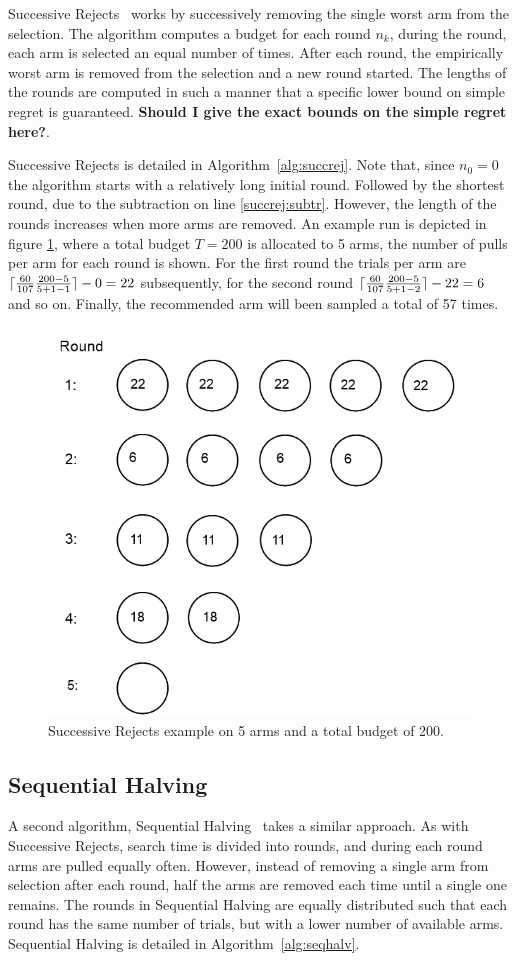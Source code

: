 \documentclass{kecsmstr}
\DeclarePairedDelimiter{\ceil}{\lceil}{\rceil}
\newcommand{\TODO}[1]{\textbf{\color{red}#1}}
\begin{document}
Successive Rejects~ works by successively removing the single worst arm from the selection. The algorithm computes a budget for each round $n_k$, during the round, each arm is selected an equal number of times. After each round, the empirically worst arm is removed from the selection and a new round started. The lengths of the rounds are computed in such a manner that a specific lower bound on simple regret is guaranteed. \TODO{Should I give the exact bounds on the simple regret here?}. 

Successive Rejects is detailed in Algorithm~\ref{alg:succrej}. Note that, since $n_0 = 0$ the algorithm starts with a relatively long initial round. Followed by the shortest round, due to the subtraction on line \ref{succrej:subtr}. However, the length of the rounds increases when more arms are removed. An example run is depicted in figure \ref{fig:succ-rej}, where a total budget $T = 200$ is allocated to 5 arms, the number of pulls per arm for each round is shown. For the first round the trials per arm are $\ceil{\frac{60}{107} \frac{200-5}{5+1-1}} - 0 = 22$ subsequently, for the second round $\ceil{\frac{60}{107} \frac{200-5}{5+1-2}} - 22 = 6$ and so on. Finally, the recommended arm will been sampled a total of 57 times.

\begin{figure}[ht]
	\centering
	\includegraphics[width=.31\textwidth]{img/succ_rej.png}
	\caption{Successive Rejects example on 5 arms and a total budget of 200.}
	\label{fig:succ-rej}
\end{figure}

\newpage

\subsection{Sequential Halving}
A second algorithm, Sequential Halving~ takes a similar approach. As with Successive Rejects, search time is divided into rounds, and during each round arms are pulled equally often. However, instead of removing a single arm from selection after each round, half the arms are removed each time until a single one remains. The rounds in Sequential Halving are equally distributed such that each round has the same number of trials, but with a lower number of available arms. Sequential Halving is detailed in Algorithm~\ref{alg:seqhalv}.
\end{document}
